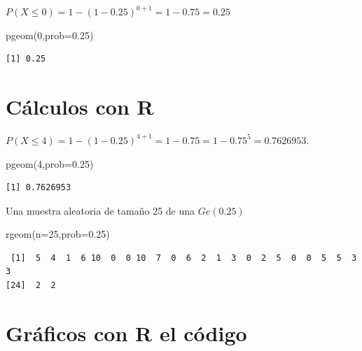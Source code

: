 \documentclass[
  letterpaper,
  DIV=11,
  numbers=noendperiod]{scrreprt}
\newenvironment{Shaded}{\begin{snugshade}}{\end{snugshade}}
\newcommand{\AttributeTok}[1]{\textcolor[rgb]{0.40,0.45,0.13}{#1}}
\newcommand{\DecValTok}[1]{\textcolor[rgb]{0.68,0.00,0.00}{#1}}
\newcommand{\FloatTok}[1]{\textcolor[rgb]{0.68,0.00,0.00}{#1}}
\newcommand{\FunctionTok}[1]{\textcolor[rgb]{0.28,0.35,0.67}{#1}}
\newcommand{\NormalTok}[1]{\textcolor[rgb]{0.00,0.23,0.31}{#1}}
\begin{document}
\(P(X\leq 0)=1- (1-0.25)^{0+1}=1-0.75=0.25\)

\begin{Shaded}
\begin{Highlighting}[]
\FunctionTok{pgeom}\NormalTok{(}\DecValTok{0}\NormalTok{,}\AttributeTok{prob=}\FloatTok{0.25}\NormalTok{)}
\end{Highlighting}
\end{Shaded}

\begin{verbatim}
[1] 0.25
\end{verbatim}

\section{Cálculos con R}\label{cuxe1lculos-con-r-1}

\(P(X\leq 4)=1-(1-0.25)^{4+1}=1-0.75=1-0.75^5=0.7626953.\)

\begin{Shaded}
\begin{Highlighting}[]
\FunctionTok{pgeom}\NormalTok{(}\DecValTok{4}\NormalTok{,}\AttributeTok{prob=}\FloatTok{0.25}\NormalTok{)}
\end{Highlighting}
\end{Shaded}

\begin{verbatim}
[1] 0.7626953
\end{verbatim}

Una muestra aleatoria de tamaño 25 de una \(Ge(0.25)\)

\begin{Shaded}
\begin{Highlighting}[]
\FunctionTok{rgeom}\NormalTok{(}\AttributeTok{n=}\DecValTok{25}\NormalTok{,}\AttributeTok{prob=}\FloatTok{0.25}\NormalTok{)}
\end{Highlighting}
\end{Shaded}

\begin{verbatim}
 [1]  5  4  1  6 10  0  0 10  7  0  6  2  1  3  0  2  5  0  0  5  5  3  3
[24]  2  2
\end{verbatim}

\section{Gráficos con R el código}\label{gruxe1ficos-con-r-el-cuxf3digo}
\end{document}

